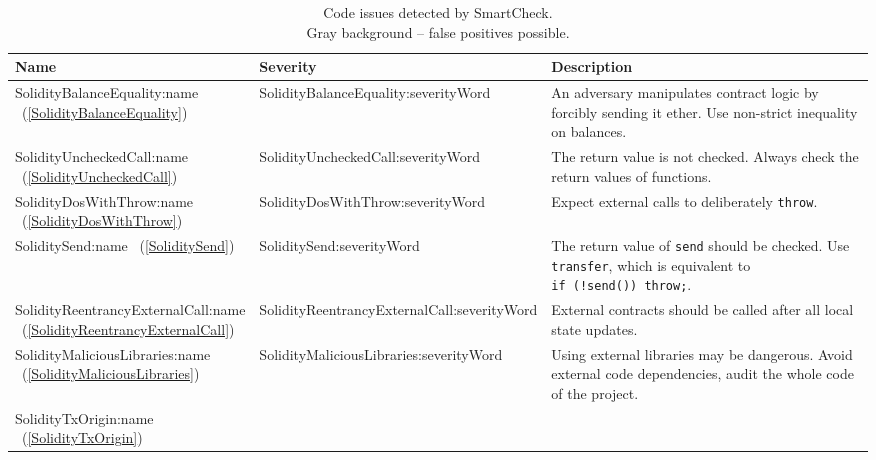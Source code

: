 \begin{table}[]
	\centering
	\caption{Code issues detected by SmartCheck. \\ Gray background -- false positives possible. }
	\begin{tabular}{|p{0.25\linewidth}|p{0.1\linewidth}|p{0.65\linewidth}|}
		\hline
		\textbf{Name} & \textbf{Severity} & \textbf{Description} \\
		\hline
		\usevalue SolidityBalanceEquality:name ~(\ref{SolidityBalanceEquality}) %
		&
		\usevalue SolidityBalanceEquality:severityWord 
		&
		An adversary manipulates contract logic by forcibly sending it ether.
		Use non-strict inequality on balances.
		\\
		\hline
		\rowcolor{lightlightgray}
		\usevalue SolidityUncheckedCall:name ~(\ref{SolidityUncheckedCall})
		&
		\usevalue SolidityUncheckedCall:severityWord 
		&
		The return value is not checked.
		Always check the return values of functions.
		\\
		\hline
		\rowcolor{lightlightgray}
		\usevalue SolidityDosWithThrow:name ~(\ref{SolidityDosWithThrow})
		&
		\usevalue SolidityDosWithThrow:severityWord 
		&
		Expect external calls to deliberately \texttt{throw}.
		\\
		\hline
		\rowcolor{lightlightgray}
		\usevalue SoliditySend:name ~(\ref{SoliditySend})
		&
		\usevalue SoliditySend:severityWord 
		&
		The return value of \texttt{send} should be checked.
		Use \texttt{transfer}, which is equivalent to \texttt{if~(!send())~throw;}.
		\\
		\hline
		\rowcolor{lightlightgray}
		\usevalue SolidityReentrancyExternalCall:name ~(\ref{SolidityReentrancyExternalCall})
		&
		\usevalue SolidityReentrancyExternalCall:severityWord 
		&
		External contracts should be called after all local state updates.
		\\
		\hline
		\rowcolor{lightlightgray}
		\usevalue SolidityMaliciousLibraries:name ~(\ref{SolidityMaliciousLibraries})
		&
		\usevalue SolidityMaliciousLibraries:severityWord 
		&
		Using external libraries may be dangerous.
		Avoid external code dependencies, audit the whole code of the project.
		\\
		\hline
		\usevalue SolidityTxOrigin:name ~(\ref{SolidityTxOrigin})

\end{tabular}
\end{table}
